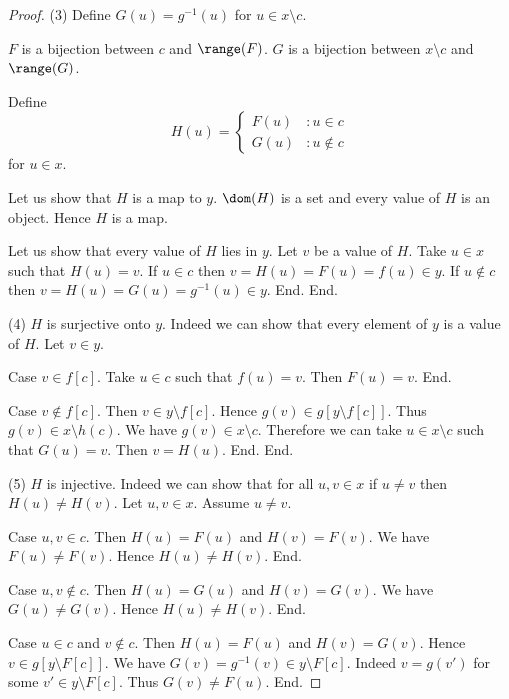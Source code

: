 \documentclass{article}
\begin{document}
\begin{forthel}
\begin{proof}
        (3) Define $G(u) = g^{-1}(u)$ for $u \in x \setminus c$.

        $F$ is a bijection between $c$ and $\range(F)$.
        $G$ is a bijection between $x \setminus c$ and $\range(G)$.

        Define \[ H(u) =
          \begin{cases}
            F(u) & : u \in c \\
            G(u) & : u \notin c
          \end{cases} \]
        for $u \in x$.

        Let us show that $H$ is a map to $y$.
          $\dom(H)$ is a set and every value of $H$ is an object.
          Hence $H$ is a map.

          Let us show that every value of $H$ lies in $y$.
            Let $v$ be a value of $H$.
            Take $u \in x$ such that $H(u) = v$.
            If $u \in c$ then $v = H(u) = F(u) = f(u) \in y$.
            If $u \notin c$ then $v = H(u) = G(u) = g^{-1}(u) \in y$.
          End.
        End.

        (4) $H$ is surjective onto $y$.
        Indeed we can show that every element of $y$ is a value of $H$.
          Let $v \in y$.

          Case $v \in f[c]$.
            Take $u \in c$ such that $f(u) = v$.
            Then $F(u) = v$.
          End.

          Case $v \notin f[c]$.
            Then $v \in y \setminus f[c]$.
            Hence $g(v) \in g[y \setminus f[c]]$.
            Thus $g(v) \in x \setminus h(c)$.
            We have $g(v) \in x \setminus c$.
            Therefore we can take $u \in x \setminus c$ such that $G(u) = v$.
            Then $v = H(u)$.
          End.
        End.

        (5) $H$ is injective.
        Indeed we can show that for all $u, v \in x$ if $u \neq v$ then $H(u) \neq H(v)$.
          Let $u,v \in x$.
          Assume $u \neq v$.

          Case $u,v \in c$.
            Then $H(u) = F(u)$ and $H(v) = F(v)$.
            We have $F(u) \neq F(v)$.
            Hence $H(u) \neq H(v)$.
          End.

          Case $u,v \notin c$.
            Then $H(u) = G(u)$ and $H(v) = G(v)$.
            We have $G(u) \neq G(v)$.
            Hence $H(u) \neq H(v)$.
          End.

          Case $u \in c$ and $v \notin c$.
            Then $H(u) = F(u)$ and $H(v) = G(v)$.
            Hence $v \in g[y \setminus F[c]]$.
            We have $G(v) = g^{-1}(v) \in y \setminus F[c]$.
            Indeed $v = g(v')$ for some $v' \in y \setminus F[c]$.
            Thus $G(v) \neq F(u)$.
          End.


\end{proof}
\end{forthel}
\end{document}
